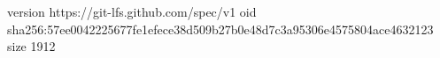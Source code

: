 version https://git-lfs.github.com/spec/v1
oid sha256:57ee0042225677fe1efece38d509b27b0e48d7c3a95306e4575804ace4632123
size 1912
